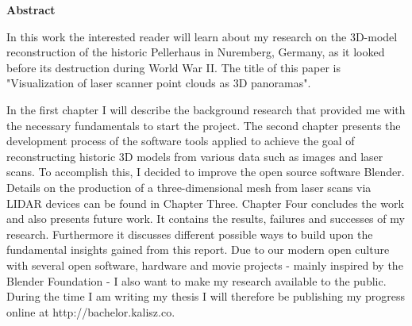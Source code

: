 \thispagestyle{plain}
\begin{center}
	
	\LARGE
	\textbf{Abstract}
	
\end{center}
\vspace{100pt}
In this work the interested reader will learn about my research on the 3D-model reconstruction of the historic Pellerhaus in Nuremberg, Germany, as it looked before its destruction during World War II. The title of this paper is "Visualization of laser scanner point clouds as 3D panoramas".

In the first chapter I will describe the background research that provided me with the necessary fundamentals to start the project.
The second chapter presents the development process of the software tools applied to achieve the goal of reconstructing historic 3D models from various data such as images and laser scans. To accomplish this, I decided to improve the open source software Blender.
Details on the production of a three-dimensional mesh from laser scans via LIDAR devices can be found in Chapter Three.
Chapter Four concludes the work and also presents future work. It contains the results, failures and successes of my research. Furthermore it discusses different possible ways to build upon the fundamental insights gained from this report.
Due to our modern open culture with several open software, hardware and movie projects - mainly inspired by the Blender Foundation - I also want to make my research available to the public. During the time I am writing my thesis I will therefore be publishing my progress online at http://bachelor.kalisz.co.

